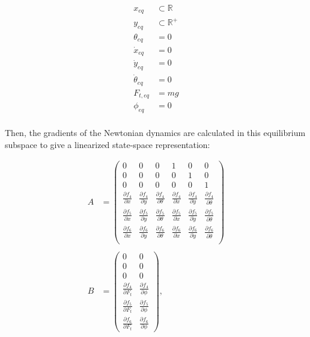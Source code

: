 \documentclass[12pt]{article}
\begin{document}
\begin{align*}
      {x}_{eq} &\subset \mathbb{R} \\
      {y}_{eq} &\subset  \mathbb{R}^+ \\
      {\theta}_{eq} &= 0 \\
	\dot{x}_{eq} &= 0 \\
	\dot{y}_{eq} &= 0 \\
	\dot{\theta}_{eq} &= 0 \\
	F_{t, eq} &= mg \\
	\phi_{eq} &= 0 \\
\end{align*}


\bigskip Then, the gradients of the Newtonian dynamics are calculated in this equilibrium subspace to give a linearized state-space representation:

\begin{align*}
A &= \begin{pmatrix}
0 & 0 & 0 & 1 & 0 & 0 \\
0 & 0 & 0 & 0 & 1 & 0 \\
0 & 0 & 0 & 0 & 0 & 1 \\
\frac{\partial f_4}{\partial x}  & \frac{\partial f_4}{\partial y}  & \frac{\partial f_4}{\partial \theta}  & \frac{\partial f_4}{\partial \dot{x}}  & \frac{\partial f_4}{\partial \dot{y}}  & \frac{\partial f_4}{\partial \dot{\theta}}  \\
\frac{\partial f_5}{\partial x}  & \frac{\partial f_5}{\partial y}  & \frac{\partial f_5}{\partial \theta}  & \frac{\partial f_5}{\partial \dot{x}}  & \frac{\partial f_5}{\partial \dot{y}}  & \frac{\partial f_5}{\partial \dot{\theta}}  \\
\frac{\partial f_6}{\partial x}  & \frac{\partial f_6}{\partial y}  & \frac{\partial f_6}{\partial \theta}  & \frac{\partial f_6}{\partial \dot{x}}  & \frac{\partial f_6}{\partial \dot{y}}  & \frac{\partial f_6}{\partial \dot{\theta}}  \\
\end{pmatrix} \\ \\
B &= \begin{pmatrix}
0 & 0 \\
0 & 0 \\
0 & 0 \\
\frac{\partial f_4}{\partial F_t}  & \frac{\partial f_4}{\partial \phi} \\
\frac{\partial f_5}{\partial F_t}  & \frac{\partial f_5}{\partial \phi} \\
\frac{\partial f_6}{\partial F_t}  & \frac{\partial f_6}{\partial \phi}
\end{pmatrix}, \\
\end{align*}
\end{document}
